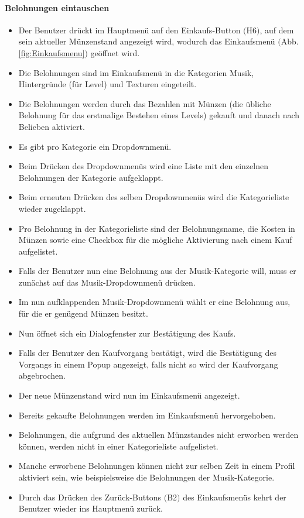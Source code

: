 \paragraph{Belohnungen eintauschen}
\begin{itemize}
	\item Der Benutzer drückt im Hauptmenü auf den Einkaufs-Button $($H6$)$, auf dem sein aktueller Münzenstand angezeigt wird, wodurch das Einkaufsmenü $($Abb. \ref{fig:Einkaufsmenu}$)$ geöffnet wird.
	\item Die Belohnungen sind im Einkaufsmenü in die Kategorien Musik, Hintergründe (für Level) und Texturen eingeteilt.
	\item Die Belohnungen werden durch das Bezahlen mit Münzen (die übliche Belohnung für das erstmalige Bestehen eines Levels) gekauft und danach nach Belieben aktiviert.
	\item Es gibt pro Kategorie ein Dropdownmenü.
	\item Beim Drücken des Dropdownmenüs wird eine Liste mit den einzelnen Belohnungen der Kategorie aufgeklappt.
	\item Beim erneuten Drücken des selben Dropdownmenüs wird die Kategorieliste wieder zugeklappt.
	\item Pro Belohnung in der Kategorieliste sind der Belohnungsname, die Kosten in Münzen sowie eine Checkbox für die mögliche Aktivierung nach einem Kauf aufgelistet.
	\item Falls der Benutzer nun eine Belohnung aus der Musik-Kategorie will, muss er zunächst auf das Musik-Dropdownmenü drücken.
	\item Im nun aufklappenden Musik-Dropdownmenü wählt er eine Belohnung aus, für die er genügend Münzen besitzt.
	\item Nun öffnet sich ein Dialogfenster zur Bestätigung des Kaufs.
	\item Falls der Benutzer den Kaufvorgang bestätigt, wird die Bestätigung des Vorgangs in einem Popup angezeigt, falls nicht so wird der Kaufvorgang abgebrochen.
	\item Der neue Münzenstand wird nun im Einkaufsmenü angezeigt.
	\item Bereits gekaufte Belohnungen werden im Einkaufsmenü hervorgehoben.
	\item Belohnungen, die aufgrund des aktuellen Münzstandes nicht erworben werden können, werden nicht in einer Kategorieliste aufgelistet.
	\item Manche erworbene Belohnungen können nicht zur selben Zeit in einem Profil aktiviert sein, wie beispielsweise die Belohnungen der Musik-Kategorie.
	\item Durch das Drücken des Zurück-Buttons $($B2$)$ des Einkaufsmenüs kehrt der Benutzer wieder ins Hauptmenü zurück.
\end{itemize}

